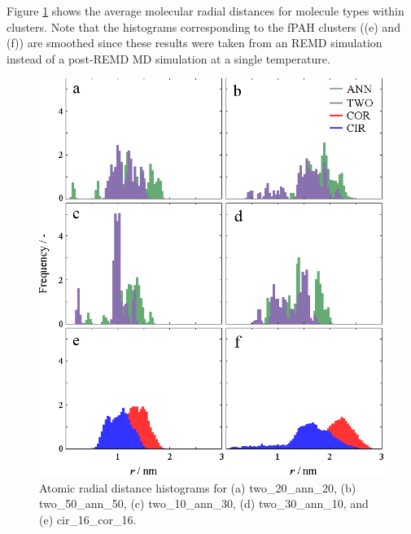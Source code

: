 Figure \ref{figSI:radialdists_molec} shows the average molecular radial distances for molecule types within clusters. Note that the histograms corresponding to the fPAH clusters ((e) and (f)) are smoothed since these results were taken from an REMD simulation instead of a post-REMD MD simulation at a single temperature.
%
\begin{figure}[!tbh]
\centering
\includegraphics[width=0.5\linewidth]{Figures/molec_histograms.eps}
\caption{Atomic radial distance histograms for (a) two\_20\_ann\_20, (b) two\_50\_ann\_50, (c) two\_10\_ann\_30, (d) two\_30\_ann\_10, and (e) cir\_16\_cor\_16.}
\label{figSI:radialdists_molec}
\end{figure}
%

\newpage